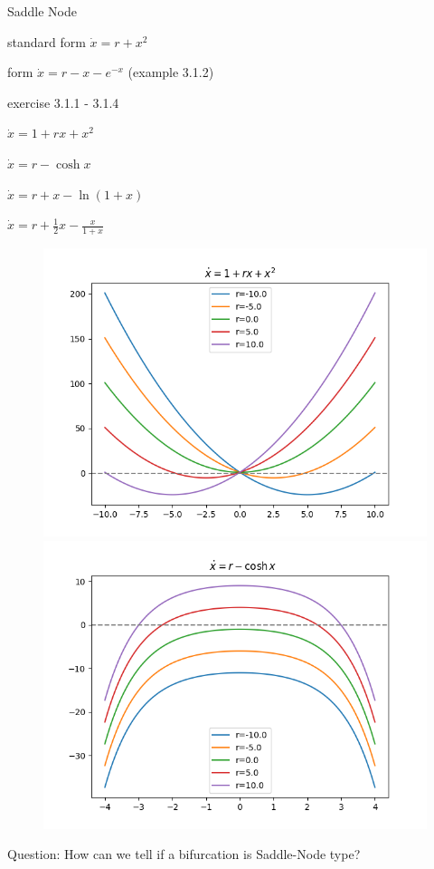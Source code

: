 \documentclass[9pt,aspectratio=43,mathserif,table]{beamer}
\begin{document}
\begin{frame}{Saddle Node}

  \begin{multicols}{2}
   standard form  $\dot x = r + x^2$

   \medskip

   form $\dot x = r -  x - e^{-x}$ (example 3.1.2)

   \medskip

   exercise 3.1.1 - 3.1.4

   $\dot x = 1 + rx + x^2$

   $\dot x = r - \cosh x$

   $\dot x = r + x - \ln(1+x)$

   $\dot x = r + \frac{ 1}{2}x - \frac{ x}{1+x}$

    \begin{figure}[!h]
      \centering
      \includegraphics[width=.3\textwidth]{fig/saddlenode-1.png}
      \includegraphics[width=.3\textwidth]{fig/saddlenode-2.png}
    \end{figure}
 
   \end{multicols}

   Question: How can we tell if a bifurcation is Saddle-Node type?
   
\end{frame}
\end{document}
